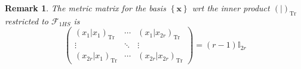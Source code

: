 \documentclass[aps, preprint]{revtex4}
\newtheorem{remark}[theorem]{Remark}
\begin{document}
\begin{remark}
The metric matrix for the basis $\left \{\mathbf{x}\right \}$ wrt the inner product $\left (\left .\text{}\right \vert \right )_{\ensuremath{\operatorname*{Tr}}}$ restricted to $\mathcal{F}_{1 H S}$ is
\begin{equation}\left (\begin{array}{ccc}\left (\left .x_{1}\right \vert x_{1}\right )_{\ensuremath{\operatorname*{Tr}}} & \cdots  & \left (\left .x_{1}\right \vert x_{2 r}\right )_{\ensuremath{\operatorname*{Tr}}} \\
\vdots  & \ddots  & \vdots  \\
\left (\left .x_{2 r}\right \vert x_{1}\right )_{\ensuremath{\operatorname*{Tr}}} & \cdots  & \left (\left .x_{2 r}\right \vert x_{2 r}\right )_{\ensuremath{\operatorname*{Tr}}}\end{array}\right ) =\left (r -1\right ) \mathbb{I}_{2 r}
\end{equation}
\end{remark}
\end{document}
